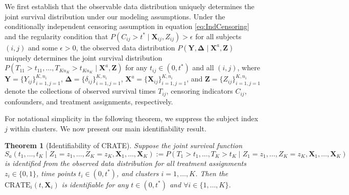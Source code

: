 \documentclass[aoas]{imsart}
\theoremstyle{plain}
\newtheorem{theorem}{Theorem}[section]
\theoremstyle{definition}
\begin{document}
We first establish that the observable data distribution uniquely determines the joint survival distribution under our modeling assumptions. Under the conditionally independent censoring assumption in equation \eqref{eq:IndCensoring} and the regularity condition that $P(C_{ij} > t^* \mid \mathbf{X}_{ij}, Z_{ij}) > \epsilon$ for all subjects $(i,j)$ and some $\epsilon > 0$, the observed data distribution $P(\mathbf{Y}, \boldsymbol{\Delta} \mid \mathbf{X}^a, \mathbf{Z})$ uniquely determines the joint survival distribution
$
P(T_{11} > t_{11}, \ldots, T_{Kn_K} > t_{Kn_K} \mid \mathbf{X}^a, \mathbf{Z})
$
for any $t_{ij} \in (0, t^*)$ and all $(i,j)$, where $\mathbf{Y} = \{Y_{ij}\}_{i=1,j=1}^{K,n_i}$, $\boldsymbol{\Delta} = \{\delta_{ij}\}_{i=1,j=1}^{K,n_i}$, $\mathbf{X}^a = \{\mathbf{X}_{ij}\}_{i=1,j=1}^{K,n_i}$, and $\mathbf{Z} = \{Z_{ij}\}_{i=1,j=1}^{K,n_i}$ denote the collections of observed survival times $T_{ij}$, censoring indicators $C_{ij}$, confounders, and treatment assignments, respectively.

For notational simplicity in the following theorem, we suppress the subject index $j$ within clusters. We now present our main identifiability result.

\begin{theorem}[Identifiability of CRATE]
Suppose the joint survival function
$
S_a(t_1, \ldots, t_K \mid Z_1 = z_1, \ldots, Z_K = z_K, \mathbf{X}_1, \ldots, \mathbf{X}_K) := P(T_1 > t_1, \ldots, T_K > t_K \mid Z_1 = z_1, \ldots, Z_K = z_K, \mathbf{X}_1, \ldots, \mathbf{X}_K)
$
is identified from the observed data distribution for all treatment assignments $z_i \in \{0,1\}$, time points $t_i \in (0, t^*)$, and clusters $i = 1, \ldots, K$. Then the $\text{CRATE}_i(t, \mathbf{X}_i)$ is identifiable for any $t \in (0, t^*)$ and $\forall i \in \{1,\dots,K\}$.
\end{theorem}
\end{document}

